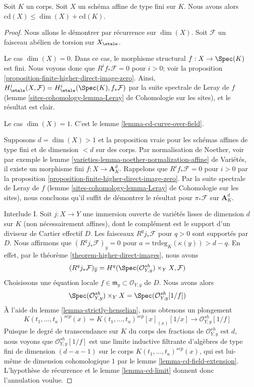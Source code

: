 \begin{proposition}
\label{proposition-cd-affine}
Soit $K$ un corps. Soit $X$ un schéma affine de type fini sur $K$.
Nous avons alors $\text{cd}(X) \leq \dim(X) + \text{cd}(K)$.
\end{proposition}

\begin{proof}
Nous allons le démontrer par récurrence sur $\dim(X)$.
Soit $\mathcal{F}$ un faisceau abélien de torsion sur $X_\etale$.

\medskip\noindent
Le cas $\dim(X) = 0$. Dans ce cas, le morphisme structural
$f : X \to \Spec(K)$ est fini. Nous voyons donc que $R^if_*\mathcal{F} = 0$
pour $i > 0$; voir la proposition \ref{proposition-finite-higher-direct-image-zero}.
Ainsi, $H^i_\etale(X, \mathcal{F}) = H^i_\etale(\Spec(K), f_*\mathcal{F})$
par la suite spectrale de Leray de $f$
(lemme \ref{sites-cohomology-lemma-Leray} de Cohomologie sur les sites),
et le résultat est clair.

\medskip\noindent
Le cas $\dim(X) = 1$. C'est le lemme \ref{lemma-cd-curve-over-field}.

\medskip\noindent
Supposons $d = \dim(X) > 1$ et la proposition vraie pour les schémas
affines de type fini et de dimension $< d$ sur des corps.
Par normalisation de Noether, voir par exemple le
lemme \ref{varieties-lemma-noether-normalization-affine} de Variétés,
il existe un morphisme fini $f : X \to \mathbf{A}^d_K$.
Rappelons que $R^if_*\mathcal{F} = 0$ pour $i > 0$ par la
proposition \ref{proposition-finite-higher-direct-image-zero}.
Par la suite spectrale de Leray de $f$
(lemme \ref{sites-cohomology-lemma-Leray} de Cohomologie sur les sites),
nous concluons qu'il suffit de démontrer le résultat pour $\pi_*\mathcal{F}$
sur $\mathbf{A}^d_K$.

\medskip\noindent
Interlude I. Soit $j : X \to Y$ une immersion ouverte de variétés lisses
de dimension $d$ sur $K$ (non nécessairement affines),
dont le complément est le support d'un diviseur de Cartier effectif $D$.
Les faisceaux $R^qj_*\mathcal{F}$ pour $q > 0$ sont supportés par $D$.
Nous affirmons que $(R^qj_*\mathcal{F})_{\overline{y}} = 0$
pour $a = \text{trdeg}_K(\kappa(y)) > d - q$. En effet, par le
théorème \ref{theorem-higher-direct-images}, nous avons
$$
(R^qj_*\mathcal{F})_{\overline{y}} =
H^q(\Spec(\mathcal{O}_{Y, y}^{sh}) \times_Y X, \mathcal{F})
$$
Choisissons une équation locale $f \in \mathfrak m_y \subset \mathcal{O}_{Y, y}$
de $D$. Nous avons alors
$$
\Spec(\mathcal{O}_{Y, y}^{sh}) \times_Y X =
\Spec(\mathcal{O}_{Y, y}^{sh}[1/f])
$$
À l'aide du lemme \ref{lemma-strictly-henselian}, nous obtenons un plongement
$$
K(t_1, \ldots, t_a)^{sep}(x) =
K(t_1, \ldots, t_a)^{sep}[x]_{(x)}[1/x]
\longrightarrow
\mathcal{O}_{Y, y}^{sh}[1/f]
$$
Puisque le degré de transcendance sur $K$ du corps des fractions de
$\mathcal{O}_{Y, y}^{sh}$ est $d$, nous voyons que $\mathcal{O}_{Y, y}^{sh}[1/f]$
est une limite inductive filtrante d'algèbres de type fini de dimension $(d - a - 1)$ sur
le corps $K(t_1, \ldots, t_a)^{sep}(x)$, qui est lui-même de
dimension cohomologique $1$ par le lemme \ref{lemma-cd-field-extension}. L'hypothèse
de récurrence et le lemme \ref{lemma-cd-limit}
donnent donc l'annulation voulue.


\end{proof}
